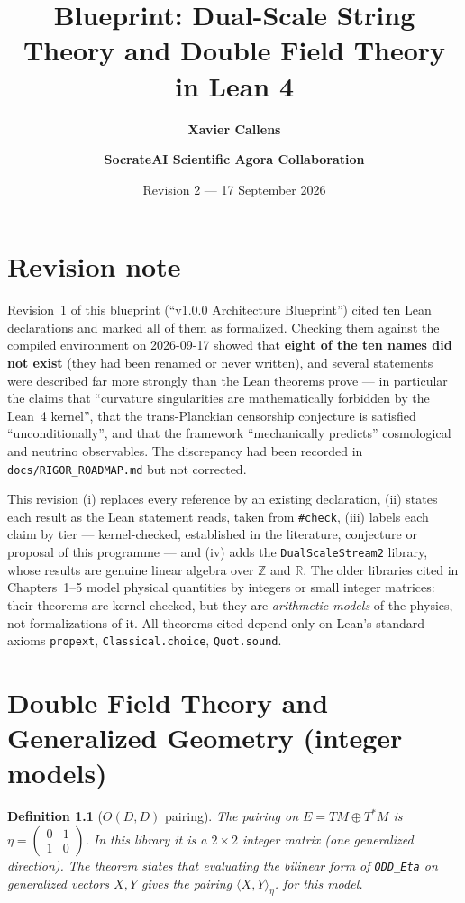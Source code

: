 \documentclass[11pt,a4paper]{report}
\title{\textbf{Blueprint: Dual-Scale String Theory and Double Field Theory in Lean 4}}
\author{\textbf{Xavier Callens} \and \textbf{SocrateAI Scientific Agora Collaboration}}
\date{Revision 2 --- 17 September 2026}
\newtheorem{definition}[theorem]{Definition}
\theoremstyle{remark}
\begin{document}
\maketitle

\chapter*{Revision note}
Revision~1 of this blueprint (``v1.0.0 Architecture Blueprint'') cited ten Lean declarations and marked all
of them as formalized. Checking them against the compiled environment on 2026-09-17 showed that
\textbf{eight of the ten names did not exist} (they had been renamed or never written), and several
statements were described far more strongly than the Lean theorems prove --- in particular the claims that
``curvature singularities are mathematically forbidden by the Lean~4 kernel'', that the trans-Planckian
censorship conjecture is satisfied ``unconditionally'', and that the framework ``mechanically predicts''
cosmological and neutrino observables. The discrepancy had been recorded in
\texttt{docs/RIGOR\_ROADMAP.md} but not corrected.

This revision (i) replaces every reference by an existing declaration, (ii) states each result as the Lean
statement reads, taken from \texttt{\#check}, (iii) labels each claim by tier --- \TA{} kernel-checked,
\TL{} established in the literature, \TC{} conjecture or proposal of this programme --- and (iv) adds the
\texttt{DualScaleStream2} library, whose results are genuine linear algebra over $\mathbb{Z}$ and
$\mathbb{R}$. The older libraries cited in Chapters~1--5 model physical quantities by integers or small
integer matrices: their theorems are kernel-checked, but they are \emph{arithmetic models} of the physics,
not formalizations of it. All theorems cited depend only on Lean's standard axioms \texttt{propext},
\texttt{Classical.choice}, \texttt{Quot.sound}.

\tableofcontents

\chapter{Double Field Theory and Generalized Geometry (integer models)}

\begin{definition}[$O(D,D)$ pairing]\label{def:odd_metric}
The pairing on $E=TM\oplus T^*M$ is $\eta=\begin{pmatrix}0&1\\1&0\end{pmatrix}$. In this library it is a
$2\times2$ integer matrix (one generalized direction). The theorem
\leanok
states that evaluating the bilinear form of \texttt{ODD\_Eta} on generalized vectors $X,Y$ gives the
pairing $\langle X,Y\rangle_\eta$. \TA{} for this model.
\end{definition}
\end{document}

